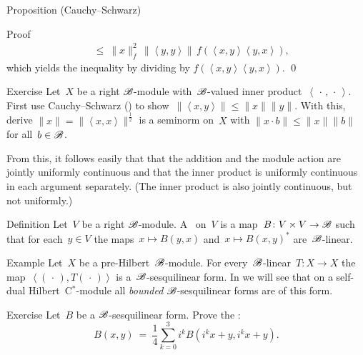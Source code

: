 \documentclass[b]{subfiles}
\begin{document}
\begin{parsec}
\begin{point}[module-CS]{Proposition (Cauchy--Schwarz)}
\begin{point}{Proof}
\begin{align*}
    & \ \leq\  \|x\|_f^2 \,
    \|\left<y,y\right>\| \,
    f(\left<x,y\right>\left<y,x\right>),
\end{align*}
    which yields the inequality by dividing by
$f(\left<x,y\right>\left<y,x\right>)$. \qed
\end{point}
\end{point}
\begin{point}{Exercise}
Let~$X$ be a right $\mathscr{B}$-module
    with~$\mathscr{B}$-valued inner product~$\left<\,\cdot\,,\,\cdot\,\right>$.
First use Cauchy--Schwarz ()
    to show~$\|\left<x,y\right>\| \leq \|x\|\|y\|$.
With this, derive $\|x\| =\|\left<x,x\right>\|^{\frac{1}{2}}$ is a seminorm on~$X$ with
    $\|x \cdot b \| \leq \|x\|\|b\|$
    for all~$b \in \mathscr{B}$.
\begin{point}%
From this, it follows easily that
that the addition and the module action
are jointly uniformly continuous
    and that the inner product is uniformly continuous in each argument
    separately.
(The inner product is also jointly continuous,
    but not uniformly.)
\end{point}
\end{point}
\begin{point}{Definition}%
Let~$V$ be a right $\mathscr{B}$-module.
A~ on~$V$
    is a map~$B\colon V\times V \to \mathscr{B}$
    such that for each~$y\in V$
    the maps~$x \mapsto B(y, x)$
        and~$x \mapsto B(x,y)^*$ are~$\mathscr{B}$-linear.
\end{point}
\begin{point}{Example}%
Let~$X$ be a pre-Hilbert~$\mathscr{B}$-module.
For every~$\mathscr{B}$-linear~$T\colon X \to X$
    the map~$\left<(\,\cdot\,), T (\,\cdot\,)\right>$
    is a~$\mathscr{B}$-sesquilinear form.
In 
    we will see that on a self-dual Hilbert~C$^*$-module
    all \emph{bounded}
    $\mathscr{B}$-sesquilinear forms
    are of this form.
\end{point}
\begin{point}{Exercise}%
Let~$B$ be a $\mathscr{B}$-sesquilinear form.
Prove the :
\begin{equation*}
    B(x,y) \ =\  \frac{1}{4} \sum_{k=0}^3 i^k B(i^k x + y, i^k x + y).
\end{equation*}
\end{point}
\end{parsec}
\end{document}
